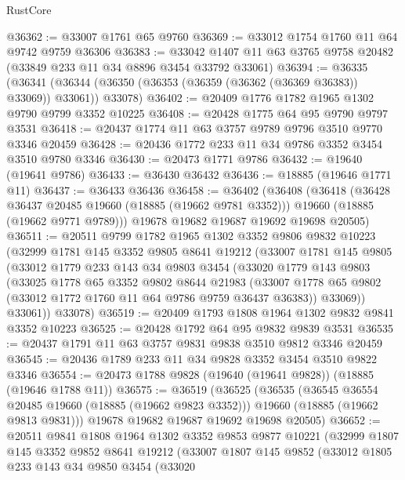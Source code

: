 \begin{lexlean}{RustCore}
\begin{coremodule}
@36362 := @33007 @1761 @65 @9760
@36369 := @33012 @1754 @1760 @11 @64 @9742 @9759 @36306
@36383 := @33042 @1407 @11 @63 @3765 @9758 @20482 (@33849 @233 @11 @34 @8896 @3454 @33792 @33061)
@36394 := @36335
    (@36341 (@36344 (@36350 (@36353 (@36359 (@36362 (@36369 @36383)) @33069)) @33061)) @33078)
@36402 := @20409 @1776 @1782 @1965 @1302 @9790 @9799 @3352 @10225
@36408 := @20428 @1775 @64 @95 @9790 @9797 @3531
@36418 := @20437 @1774 @11 @63 @3757 @9789 @9796 @3510 @9770 @3346 @20459
@36428 := @20436 @1772 @233 @11 @34 @9786 @3352 @3454 @3510 @9780 @3346
@36430 := @20473 @1771 @9786
@36432 := @19640 (@19641 @9786)
@36433 := @36430 @36432
@36436 := @18885 (@19646 @1771 @11)
@36437 := @36433 @36436
@36458 := @36402
    (@36408
      (@36418
        (@36428 @36437 @20485 @19660 (@18885 (@19662 @9781 @3352)))
        @19660
        (@18885 (@19662 @9771 @9789)))
      @19678
      @19682
      @19687
      @19692
      @19698
      @20505)
@36511 := @20511
    @9799
    @1782
    @1965
    @1302
    @3352
    @9806
    @9832
    @10223
    (@32999
      @1781
      @145
      @3352
      @9805
      @8641
      @19212
      (@33007
        @1781
        @145
        @9805
        (@33012
          @1779
          @233
          @143
          @34
          @9803
          @3454
          (@33020
            @1779
            @143
            @9803
            (@33025
              @1778
              @65
              @3352
              @9802
              @8644
              @21983
              (@33007 @1778 @65 @9802 (@33012 @1772 @1760 @11 @64 @9786 @9759 @36437 @36383))
              @33069))
          @33061))
      @33078)
@36519 := @20409 @1793 @1808 @1964 @1302 @9832 @9841 @3352 @10223
@36525 := @20428 @1792 @64 @95 @9832 @9839 @3531
@36535 := @20437 @1791 @11 @63 @3757 @9831 @9838 @3510 @9812 @3346 @20459
@36545 := @20436 @1789 @233 @11 @34 @9828 @3352 @3454 @3510 @9822 @3346
@36554 := @20473 @1788 @9828 (@19640 (@19641 @9828)) (@18885 (@19646 @1788 @11))
@36575 := @36519
    (@36525
      (@36535
        (@36545 @36554 @20485 @19660 (@18885 (@19662 @9823 @3352)))
        @19660
        (@18885 (@19662 @9813 @9831)))
      @19678
      @19682
      @19687
      @19692
      @19698
      @20505)
@36652 := @20511
    @9841
    @1808
    @1964
    @1302
    @3352
    @9853
    @9877
    @10221
    (@32999
      @1807
      @145
      @3352
      @9852
      @8641
      @19212
      (@33007
        @1807
        @145
        @9852
        (@33012
          @1805
          @233
          @143
          @34
          @9850
          @3454
          (@33020

\end{coremodule}
\end{lexlean}
